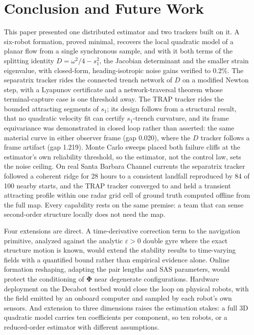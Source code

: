 \documentclass[lettersize,journal]{IEEEtran}
\begin{document}
\section{Conclusion and Future Work}
\label{sec:conclusion}
\label{sec:future}

This paper presented one distributed estimator and two trackers built
on it. A six-robot formation, proved minimal, recovers the local
quadratic model of a planar flow from a single synchronous sample, and
with it both terms of the splitting identity $D = \omega^2/4 - s_1^2$,
the Jacobian determinant and the smaller strain eigenvalue, with
closed-form, heading-isotropic noise gains verified to $0.2\%$. The
separatrix tracker rides the connected trench network of $D$ on a
modified Newton step, with a Lyapunov certificate and a
network-traversal theorem whose terminal-capture case is one threshold
away. The TRAP tracker rides the bounded attracting segments of $s_1$;
its design follows from a structural result, that no quadratic velocity
fit can certify $s_1$-trench curvature, and its frame equivariance was
demonstrated in closed loop rather than asserted: the same material
curve in either observer frame (gap 0.020), where the $D$ tracker
follows a frame artifact (gap 1.219). Monte Carlo sweeps placed both
failure cliffs at the estimator's own reliability threshold, so the
estimator, not the control law, sets the noise ceiling. On real Santa
Barbara Channel currents the separatrix tracker followed a coherent
ridge for 28 hours to a consistent landfall reproduced by 84 of 100
nearby starts, and the TRAP tracker converged to and held a transient
attracting profile within one radar grid cell of ground truth computed
offline from the full map. Every capability rests on the same premise:
a team that can sense second-order structure locally does not need the
map.

Four extensions are direct. A time-derivative correction term to the
navigation primitive, analyzed against the analytic $\varepsilon > 0$
double gyre where the exact structure motion is known, would extend
the stability results to time-varying fields with a quantified bound
rather than empirical evidence alone. Online formation reshaping,
adapting the pair lengths and SAS parameters, would protect the
conditioning of $\boldsymbol{\Phi}$ near degenerate configurations.
Hardware deployment on the Decabot testbed would close the loop on
physical robots, with the field emitted by an onboard computer and
sampled by each robot's own sensors. And extension to three
dimensions raises the estimation stakes: a full 3D quadratic model
carries ten coefficients per component, so ten robots, or a
reduced-order estimator with different assumptions.
\end{document}
